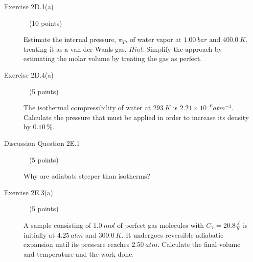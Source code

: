 \documentclass[12pt, openany, letterpaper]{memoir}
\begin{document}
\begin{description}
	\vspace{20em}
	\item [Exercise 2D.1(a)] ~ (10 points)
	
	Estimate the internal pressure, $\pi_T$, of water vapor at $1.00~bar$ and $400.0~K$, treating it as a van der Waals gas. \emph{Hint}: Simplify the approach by estimating the molar volume by treating the gas as perfect.
	
	\vspace{20em}
	\item [Exercise 2D.4(a)] ~ (5 points)
	
	The isothermal compressibility of water at $293~K$ is $2.21\times10^{-6}atm^{-1}$. Calculate the pressure that must be applied in order to increase its density by $0.10~\%$.
	
	\vspace{12em}
	\item [Discussion Question 2E.1] ~ (5 points)
	
	Why are adiabats steeper than isotherms?
	
	\vspace{10em}
	\item [Exercise 2E.3(a)] ~ (5 points)
	
	A sample consisting of $1.0~mol$ of perfect gas molecules with $C_V=20.8\frac{J}{K}$ is initially at $4.25~atm$ and $300.0~K$. It undergoes reversible adiabatic expansion until its pressure reaches $2.50~atm$. Calculate the final volume and temperature and the work done.
\end{description}
\end{document}
